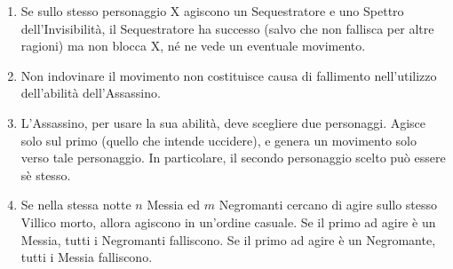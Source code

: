 \documentclass[a4paper,10pt]{article}
\begin{document}
\begin{enumerate}
	\item Se sullo stesso personaggio X agiscono un Sequestratore e uno Spettro dell'Invisibilità, il Sequestratore ha successo (salvo che non fallisca per altre ragioni) ma non blocca X, né ne vede un eventuale movimento.


	\item Non indovinare il movimento non costituisce causa di fallimento nell'utilizzo dell'abilità dell'Assassino.

	\item L'Assassino, per usare la sua abilità, deve scegliere due personaggi. Agisce solo sul primo (quello che intende uccidere), e genera un movimento solo verso tale personaggio. In particolare, il secondo personaggio scelto può essere sè stesso.



	\item Se nella stessa notte $n$ Messia ed $m$ Negromanti cercano di agire sullo stesso Villico morto, allora agiscono in un'ordine casuale. Se il primo ad agire è un Messia, tutti i Negromanti falliscono. Se il primo ad agire è un Negromante, tutti i Messia falliscono.


\end{enumerate}
\end{document}
